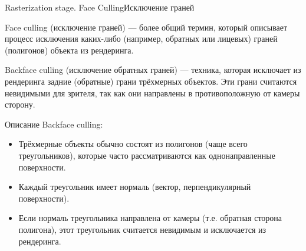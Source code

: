 \documentclass{beamer}
\begin{document}
	\begin{frame}{Rasterization stage. Face Culling}{Исключение граней}

		Face culling (исключение граней) --- более общий термин, который описывает процесс исключения каких-либо (например, обратных или лицевых) граней (полигонов) объекта из рендеринга.
		
		Backface culling (исключение обратных граней) --- техника, которая исключает из рендеринга задние (обратные) грани трёхмерных объектов. Эти грани считаются невидимыми для зрителя, так как они направлены в противоположную от камеры сторону.
	
		{ \footnotesize
		Описание Backface culling:
		\begin{itemize}
			\item 	
			Трёхмерные объекты обычно состоят из полигонов (чаще всего треугольников), которые часто рассматриваются как однонаправленные поверхности.
			\item 
			Каждый треугольник имеет нормаль (вектор, перпендикулярный поверхности).
			\item 
			Если нормаль треугольника направлена от камеры (т.е. обратная сторона полигона), этот треугольник считается невидимым и исключается из рендеринга.
		\end{itemize}

		
		}

\end{frame}
\end{document}
